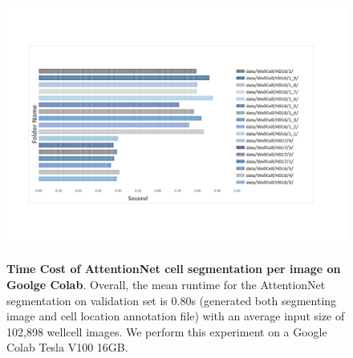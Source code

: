 \begin{figure}[h]
\begin{center}
\includegraphics[width=1.2\textwidth]{thesis-template-master/images/duration.pdf}

\label{fig:cost}
\end{center}
\caption{\textbf{Time Cost of AttentionNet cell segmentation per image on Goolge Colab}. Overall, the mean runtime for the AttentionNet segmentation on validation set is 0.80s (generated both segmenting image and cell location annotation file) with an average input size of 102,898 wellcell images. We perform this experiment on a  Google Colab Tesla V100 16GB.}
\end{figure}


